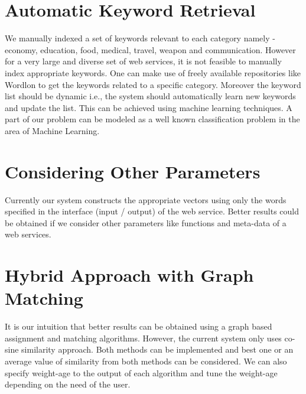 \documentclass[12pt, oneside]{book}
\begin{document}
\section{Automatic Keyword Retrieval}
We manually indexed a set of keywords relevant to each category namely - economy, education, food, medical, travel, weapon and communication. However for a very large and diverse set of web services, it is not feasible to manually index appropriate keywords. One can make use of freely available repositories like Wordlon to get the keywords related to a specific category. Moreover the keyword list should be dynamic i.e., the system should automatically learn new keywords and update the list. This can be achieved using machine learning techniques. A part of our problem can be modeled as a well known classification problem in the area of Machine Learning.
\section{Considering Other Parameters}
Currently our system constructs the appropriate vectors using only the words specified in the interface (input / output) of the web service. Better results could be obtained if we consider other parameters like functions and meta-data of a web services.
\section{Hybrid Approach with Graph Matching}
It is our intuition that better results can be obtained using a graph based assignment and matching algorithms. However, the current system only uses co-sine similarity approach. Both methods can be implemented and best one or an average value of similarity from both methods can be considered. We can also specify weight-age to the output of each algorithm and tune the weight-age depending on the need of the user.

\pagebreak


%
%
\end{document}
